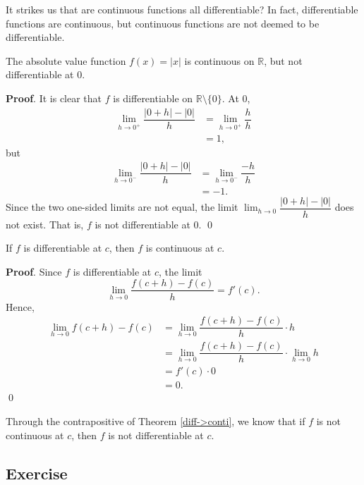 \documentclass[11pt]{book}
\theoremstyle{break}
\theoremstyle{no_label}
\newcommand{\bbR}{\mathbb{R}}
\numberwithin{equation}{section}
\begin{document}
It strikes us that are continuous functions all differentiable? In fact, differentiable functions are continuous, but continuous functions are not deemed to be differentiable.

\begin{example}
    The absolute value function $f(x)=|x|$ is continuous on $\bbR$, but not differentiable at $0$.
\end{example}
\textbf{Proof}. It is clear that $f$ is differentiable on $\bbR\setminus\{0\}$. At $0$, \begin{align*}
    \lim_{h\to 0^+}\dfrac{|0+h|-|0|}{h}&=\lim_{h\to 0^+}\dfrac{h}{h}\\
    &=1,
\end{align*} but \begin{align*}
    \lim_{h\to 0^-}\dfrac{|0+h|-|0|}{h}&=\lim_{h\to 0^-}\dfrac{-h}{h}\\
    &=-1.
\end{align*} Since the two one-sided limits are not equal, the limit $\displaystyle\lim_{h\to 0}\dfrac{|0+h|-|0|}{h}$ does not exist. That is, $f$ is not differentiable at $0$. \qed

\begin{theorem}\label{diff->conti}
    If $f$ is differentiable at $c$, then $f$ is continuous at $c$.
\end{theorem}
\textbf{Proof}. Since $f$ is differentiable at $c$, the limit $$\lim_{h\to 0}\dfrac{f(c+h)-f(c)}{h}=f'(c).$$ Hence, \begin{align*}
    \lim_{h\to 0}f(c+h)-f(c)&=\lim_{h\to 0}\dfrac{f(c+h)-f(c)}{h}\cdot h\\
    &=\lim_{h\to 0}\dfrac{f(c+h)-f(c)}{h}\cdot \lim_{h\to 0} h\\
    &=f'(c)\cdot 0\\
    &=0.
\end{align*} \qed

\begin{remark}
    Through the contrapositive of Theorem \ref{diff->conti}, we know that if $f$ is not continuous at $c$, then $f$ is not differentiable at $c$.
\end{remark}

\subsection*{Exercise}
\end{document}
